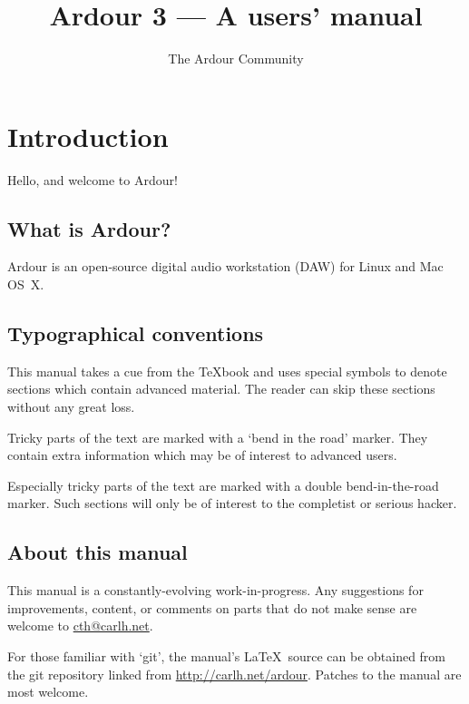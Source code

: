 \documentclass[10pt,a4paper]{book}
\title{Ardour 3 --- A users' manual}
\author{The Ardour Community}
\date{}
\begin{document}
\maketitle

\tableofcontents

\chapter{Introduction}

Hello, and welcome to Ardour!

\section{What is Ardour?}

Ardour is an open-source digital audio workstation (DAW) for Linux and Mac OS~X.

\section{Typographical conventions}

This manual takes a cue from the \TeX{}book and uses special symbols
to denote sections which contain advanced material.  The reader can
skip these sections without any great loss.

\begin{danger}
Tricky parts of the text are marked with a `bend in the road' marker.
They contain extra information which may be of interest to advanced
users.
\end{danger}

\begin{ddanger}
Especially tricky parts of the text are marked with a double
bend-in-the-road marker.  Such sections will only be of interest to
the completist or serious hacker.
\end{ddanger}


\section{About this manual}

This manual is a constantly-evolving work-in-progress.  Any
suggestions for improvements, content, or comments on parts that do
not make sense are welcome to \url{cth@carlh.net}.  

\begin{danger}
For those familiar with `git', the manual's \LaTeX\ source can be
obtained from the git repository linked from
\url{http://carlh.net/ardour}.  Patches to the manual are most welcome.
\end{danger}
\end{document}
